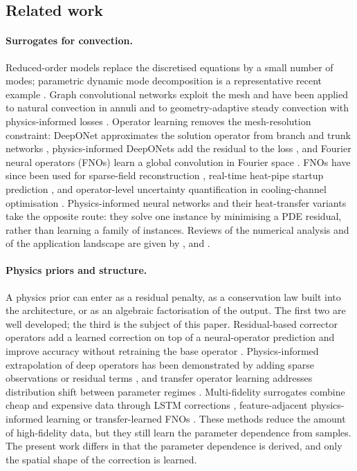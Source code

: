 \documentclass[11pt,a4paper]{article}
\begin{document}
\subsection{Related work}
\label{sec:related}

\paragraph{Surrogates for convection.} Reduced-order models replace the discretised equations by a
small number of modes; parametric dynamic mode decomposition is a representative recent example
\citep{huhn2022parametric}. Graph convolutional networks exploit the mesh and have been applied to
natural convection in annuli \citep{feng2024graph} and to geometry-adaptive steady convection with
physics-informed losses \citep{peng2023physics}. Operator learning removes the mesh-resolution
constraint: DeepONet approximates the solution operator from branch and trunk networks
\citep{lu2021learning}, physics-informed DeepONets add the residual to the loss
\citep{wang2021learning}, and Fourier neural operators (FNOs) learn a global convolution in Fourier
space \citep{li2021fourier}. FNOs have since been used for sparse-field reconstruction
\citep{zhao2023recfno}, real-time heat-pipe startup prediction \citep{yu2026fourier}, and
operator-level uncertainty quantification in cooling-channel optimisation \citep{sahin2023deep}.
Physics-informed neural networks \citep{raissi2019physics} and their heat-transfer variants
\citep{cai2021physics,jalili2023physics} take the opposite route: they solve one instance by minimising a PDE
residual, rather than learning a family of instances. Reviews of the numerical analysis and of the
application landscape are given by \citet{deryck2024numerical}, \citet{meng2025physics} and
\citet{luo2025physics}.

\paragraph{Physics priors and structure.} A physics prior can enter as a residual penalty, as a
conservation law built into the architecture, or as an algebraic factorisation of the output. The
first two are well developed; the third is the subject of this paper. Residual-based corrector
operators add a learned correction on top of a neural-operator prediction and improve accuracy
without retraining the base operator \citep{jha2023residual,cao2023residual}. Physics-informed
extrapolation of deep operators has been demonstrated by adding sparse observations or residual
terms \citep{zhu2023reliable}, and transfer operator learning addresses distribution shift between
parameter regimes \citep{goswami2022deep}. Multi-fidelity surrogates combine cheap and expensive
data through LSTM corrections \citep{conti2022multi}, feature-adjacent physics-informed learning
\citep{chen2023feature} or transfer-learned FNOs \citep{lyu2023multi}. These methods reduce the
amount of high-fidelity data, but they still learn the parameter dependence from samples. The
present work differs in that the parameter dependence is derived, and only the spatial shape of the
correction is learned.
\end{document}

